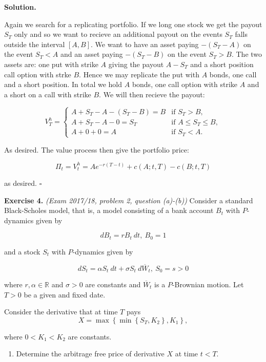 \documentclass[
]{article}
\providecommand{\tightlist}{%
  \setlength{\itemsep}{0pt}\setlength{\parskip}{0pt}}
\begin{document}
\textbf{Solution.}

Again we search for a replicating portfolio. If we long one stock we get
the payout \(S_T\) only and so we want to recieve an additional payout
on the events \(S_T\) falls outside the interval \([A,B]\). We want to
have an asset paying \(-(S_T-A)\) on the event \(S_T<A\) and an asset
paying \(-(S_T-B)\) on the event \(S_T>B\). The two assets are: one put
with strike \(A\) giving the payout \(A-S_T\) and a short position call
option with strke \(B\). Hence we may replicate the put with \(A\)
bonds, one call and a short position. In total we hold \(A\) bonds, one
call option with strike \(A\) and a short on a call with strike \(B\).
We will then recieve the payout:

\[
V_T^h=
\begin{cases}
  A+S_T-A-(S_T-B)=B & \text{if }S_T>B,\\
  A + S_T - A-0=S_T& \text{if }A\le S_T\le B,\\
  A+0+0=A &\text{if }S_T< A.
\end{cases}
\]

As desired. The value process then give the portfolio price:

\[
\Pi_t=V_t^h=Ae^{-r(T-t)}+c(A;t,T)-c(B;t,T)
\]

as desired. \(\square\)

\textbf{Exercise 4.} \emph{(Exam 2017/18, problem 2, question (a)-(b))}
Consider a standard Black-Scholes model, that is, a model consisting of
a bank account \(B_t\) with \(P\)-dynamics given by

\[
dB_t=rB_t\ dt,\ B_0=1
\]

and a stock \(S_t\) with \(P\)-dynamics given by

\[
dS_t=\alpha S_t\ dt+\sigma S_t\ d\overline{W}_t,\ S_0=s>0
\]

where \(r,\alpha\in\mathbb{R}\) and \(\sigma >0\) are constants and
\(\overline{W}_t\) is a \(P\)-Brownian motion. Let \(T>0\) be a given
and fixed date.

Consider the derivative that at time \(T\) pays \[
X=\max\left\{\min\left\{S_T,K_2\right\},K_1\right\},
\]

where \(0<K_1<K_2\) are constants.

\begin{enumerate}
\def\labelenumi{\alph{enumi}.}
\tightlist
\item
  Determine the arbitrage free price of derivative \(X\) at time
  \(t<T\).
\end{enumerate}
\end{document}
